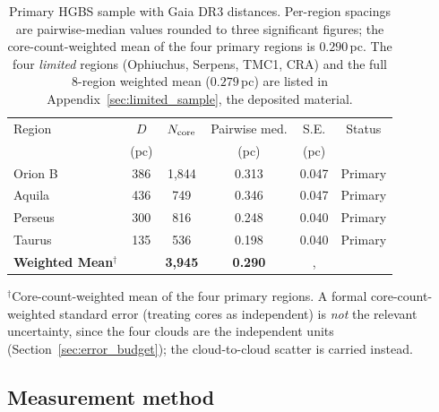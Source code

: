 \documentclass[usenatbib,twoside,twocolumn]{mnras}
\begin{document}
\begin{table}
\caption{Primary HGBS sample with Gaia DR3 distances. Per-region spacings are pairwise-median values rounded to three significant figures; the core-count-weighted mean of the four primary regions is $0.290$\,pc. The four \emph{limited} regions (Ophiuchus, Serpens, TMC1, CRA) and the full 8-region weighted mean ($0.279$\,pc) are listed in Appendix~\ref{sec:limited_sample}, the deposited material.}
\label{tab:sample}
\footnotesize
\setlength{\tabcolsep}{3pt}
\begin{tabular}{lccccc}
\toprule
Region & $D$ & $N_{\rm core}$ & Pairwise med. & S.E. & Status \\
       & (pc) &  & (pc) & (pc) &  \\
\midrule
Orion B  & 386 & 1,844 & 0.313 & 0.047 & Primary \\
Aquila   & 436 & 749   & 0.346 & 0.047 & Primary \\
Perseus  & 300 & 816   & 0.248 & 0.040 & Primary \\
Taurus   & 135 & 536   & 0.198 & 0.040 & Primary \\
\midrule
\textbf{Weighted Mean}$^\dagger$ &  & \textbf{3,945} & \textbf{0.290} &, &  \\
\bottomrule
\end{tabular}
\par\vspace{2pt}
\footnotesize $^\dagger$Core-count-weighted mean of the four primary regions. A formal core-count-weighted standard error (treating cores as independent) is \emph{not} the relevant uncertainty, since the four clouds are the independent units (Section~\ref{sec:error_budget}); the cloud-to-cloud scatter is carried instead.
\end{table}

\subsection{Measurement method}
\label{sec:methodology}
\end{document}
